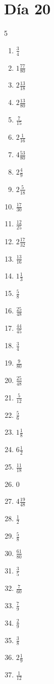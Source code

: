 \documentclass[12pt]{article}
\begin{document}
\section*{Día 20}
\begin{multicols}{5}\begin{enumerate}
\item $ \frac{3}{4} $
\item $ 1 \frac{77}{80} $
\item $ 2 \frac{13}{18} $
\item $ 2 \frac{13}{80} $
\item $ \frac{7}{15} $
\item $ 2 \frac{1}{16} $
\item $ 4 \frac{53}{80} $
\item $ 2 \frac{4}{9} $
\item $ 2 \frac{5}{18} $
\item $ \frac{17}{30} $
\item $ \frac{12}{25} $
\item $ 2 \frac{17}{32} $
\item $ \frac{13}{16} $
\item $ 1 \frac{1}{3} $
\item $ \frac{5}{8} $
\item $ \frac{25}{48} $
\item $ \frac{44}{45} $
\item $ \frac{3}{4} $
\item $ \frac{9}{80} $
\item $ \frac{25}{48} $
\item $ \frac{5}{12} $
\item $ \frac{5}{6} $
\item $ 1 \frac{1}{8} $
\item $ 6 \frac{1}{2} $
\item $ \frac{11}{18} $
\item $ 0 $
\item $ 4 \frac{19}{48} $
\item $ \frac{1}{2} $
\item $ \frac{5}{8} $
\item $ \frac{61}{80} $
\item $ \frac{3}{5} $
\item $ \frac{7}{60} $
\item $ \frac{7}{9} $
\item $ \frac{2}{9} $
\item $ \frac{3}{8} $
\item $ 2 \frac{1}{9} $
\item $ \frac{1}{12} $

\end{enumerate}
\end{multicols}
\end{document}
